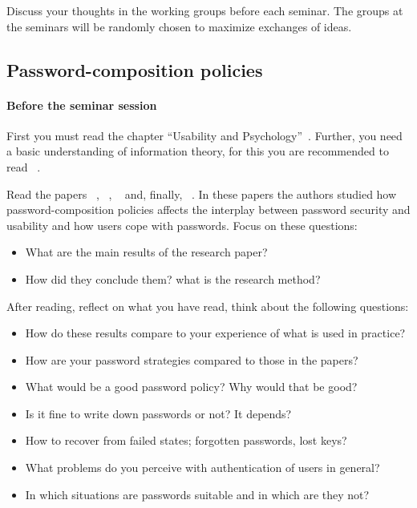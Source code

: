 Discuss your thoughts in the working groups before each seminar.
The groups at the seminars will be randomly chosen to maximize exchanges of 
ideas.

\subsection{Password-composition policies}%
\label{password-policies}

\paragraph{Before the seminar session}

First you must read the chapter \enquote{Usability and 
  Psychology}~\cite[Ch.~2]{Anderson2008sea}.
Further, you need a basic understanding of information theory, for this you are 
recommended to read ~\cite{Ueltschi2013se}.

Read the papers
~\cite{OfPasswordsAndPeople}, 
~\cite{GuessAgainAndAgain},
~\cite{CanLongPasswordsBeSecureAndUsable} 
and, finally,
~\cite{PasswordLifeCycle}.
In these papers the authors studied how password-composition policies affects 
the interplay between password security and usability and how users cope with 
passwords.
Focus on these questions:
\begin{itemize}
  \item What are the main results of the research paper?
  \item How did they conclude them?
    \Ie what is the research method?
\end{itemize}

After reading, reflect on what you have read, think about the following 
questions:
\begin{itemize}
  \item How do these results compare to your experience of what is used in 
    practice?
  \item How are your password strategies compared to those in the papers?
  \item What would be a good password policy?
    Why would that be good?
  \item Is it fine to write down passwords or not?
    It depends?
  \item How to recover from failed states; \eg forgotten passwords, lost keys?
  \item What problems do you perceive with authentication of users in general?
  \item In which situations are passwords suitable and in which are they not?
\end{itemize}


